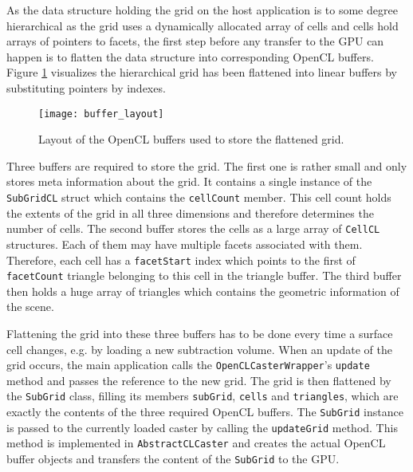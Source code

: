 As the data structure holding the grid on the host application is to some degree hierarchical as the grid uses a dynamically allocated array of cells and cells hold arrays of pointers to facets, the first step before any transfer to the GPU can happen is to flatten the data structure into corresponding OpenCL buffers. Figure \ref{fig:buffer_layout} visualizes the hierarchical grid has been flattened into linear buffers by substituting pointers by indexes.

\begin{figure}
\centering
\texttt{[image: buffer\_layout]}
\caption{Layout of the OpenCL buffers used to store the flattened grid.}
\label{fig:buffer_layout}
\end{figure}

Three buffers are required to store the grid. The first one is rather small and only stores meta information about the grid. It contains a single instance of the \lstinline!SubGridCL! struct which contains the \lstinline!cellCount! member. This cell count holds the extents of the grid in all three dimensions and therefore determines the number of cells.
The second buffer stores the cells as a large array of \lstinline!CellCL! structures. Each of them may have multiple facets associated with them. Therefore, each cell has a \lstinline!facetStart! index which points to the first of \lstinline!facetCount! triangle belonging to this cell in the triangle buffer.
The third buffer then holds a huge array of triangles which contains the geometric information of the scene.

Flattening the grid into these three buffers has to be done every time a surface cell changes, e.g. by loading a new subtraction volume. When an update of the grid occurs, the main application calls the \lstinline!OpenCLCasterWrapper!'s \lstinline!update! method and passes the reference to the new grid. The grid is then flattened by the \lstinline!SubGrid! class, filling its members \lstinline!subGrid!, \lstinline!cells! and \lstinline!triangles!, which are exactly the contents of the three required OpenCL buffers. The \lstinline!SubGrid! instance is passed to the currently loaded caster by calling the \lstinline!updateGrid! method. This method is implemented in \lstinline!AbstractCLCaster! and creates the actual OpenCL buffer objects and transfers the content of the \lstinline!SubGrid! to the GPU.


